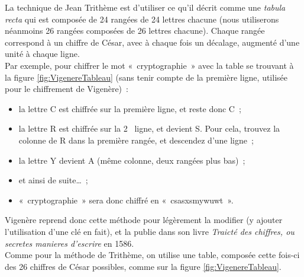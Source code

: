 La technique de Jean Trithème est d'utiliser ce qu'il décrit comme une
\emph{tabula recta} qui est composée de 24 rangées de 24
lettres chacune (nous utiliserons néanmoins 26 rangées composées
de 26 lettres chacune). 
Chaque rangée correspond à un chiffre de César,
avec à chaque fois un décalage, augmenté d'une unité à chaque ligne. \\

Par exemple, pour chiffrer le mot «~cryptographie~» avec la table se
trouvant à la figure \ref{fig:VigenereTableau} (sans tenir 
compte de la première ligne, utilisée pour le chiffrement de
Vigenère)~: 
\begin{itemize}
  \item la lettre C est chiffrée sur la première ligne, et reste
    donc C~;
  \item la lettre R est chiffrée sur la 2\ieme~ ligne, et devient
    S. Pour cela, trouvez la colonne de R dans la première rangée, et
    descendez d'une ligne~;
  \item la lettre Y devient A (même colonne, deux rangées plus bas)~;
  \item et ainsi de suite\dots~;
  \item «~cryptographie~» sera donc chiffré en «~csasxsmywuwt~».
\end{itemize}


Vigenère reprend donc cette méthode pour légèrement la modifier (y
ajouter l'utilisation d'une clé en fait), et la publie dans son livre
\emph{Traicté des chiffres, ou secretes
  manieres d'escrire} en 1586. \\

Comme pour la méthode de Trithème, on utilise une table, composée
cette fois-ci des 26 chiffres de César possibles, comme sur la figure
\ref{fig:VigenereTableau}. \\


